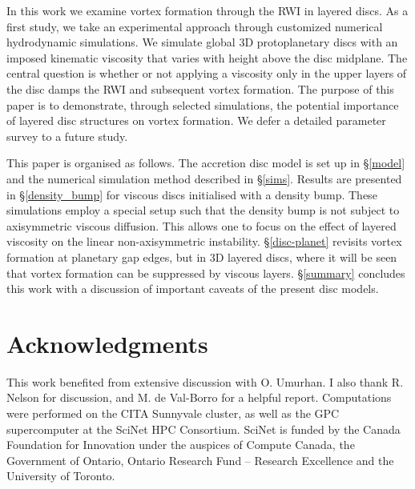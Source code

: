 \documentclass[useAMS,usenatbib]{mn2e}
\begin{document}
In this work we examine vortex formation through the RWI in
layered discs. As a first study, we take an
experimental approach through customized numerical hydrodynamic
simulations. We simulate global 3D protoplanetary discs with an imposed
kinematic viscosity that varies with height above the disc
midplane. %
The central question is whether or not applying a viscosity only in the upper
layers of the disc damps the RWI and subsequent vortex formation.   
The purpose of this paper is to demonstrate, through selected 
simulations, the potential importance of layered disc structures on
vortex formation. We defer a detailed parameter survey to a future
study.  

 
This paper is organised as follows. The accretion disc model is 
set up in \S\ref{model} and the numerical simulation method described
in \S\ref{sims}. Results are presented in \S\ref{density_bump} for 
viscous discs initialised with a density bump. These 
simulations employ a special setup such that the density bump is not
subject to axisymmetric viscous diffusion. This allows one to
focus on the effect of layered viscosity on the linear
non-axisymmetric instability. \S\ref{disc-planet} revisits vortex
formation at planetary gap edges, but in 3D layered discs, 
where it will be seen that vortex formation can be suppressed by
viscous layers. \S\ref{summary} concludes this work with a discussion
of important caveats of the present disc models.   







\section*{Acknowledgments}
This work benefited from extensive discussion with O. Umurhan. I also
thank R. Nelson for discussion, and M. de Val-Borro for a
helpful report.   Computations were performed on the
CITA Sunnyvale cluster, as well as the GPC supercomputer at the SciNet
HPC Consortium. SciNet is funded by the Canada Foundation for
Innovation under the auspices of Compute Canada, the Government of
Ontario, Ontario Research Fund – Research Excellence and the
University of Toronto.   




\appendix

%
\end{document}
